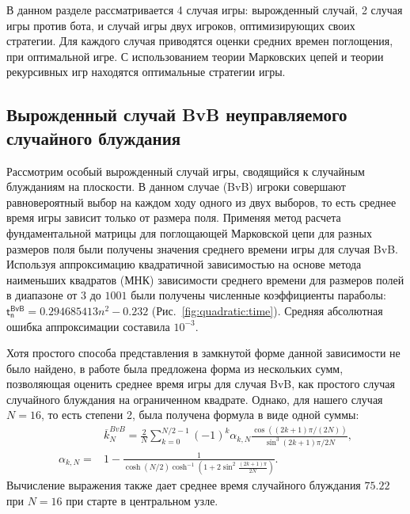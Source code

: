 В данном разделе рассматривается 4 случая игры: вырожденный случай, 2 случая игры против бота, и случай игры двух игроков, оптимизирующих своих стратегии. Для каждого случая приводятся оценки средних времен поглощения, при оптимальной игре. С использованием теории Марковских цепей и теории рекурсивных игр находятся оптимальные стратегии игры.

\subsection{Вырожденный случай BvB неуправляемого случайного блуждания}\label{subsec:ch3/sec3/sub1}

Рассмотрим особый вырожденный случай игры, сводящийся к случайным блужданиям на плоскости. В данном случае (BvB) игроки совершают равновероятный выбор на каждом ходу одного из двух выборов, то есть среднее время игры зависит только от размера поля. Применяя метод расчета фундаментальной матрицы для поглощающей Марковской цепи для разных размеров поля были получены значения среднего времени игры для случая BvB. Используя аппроксимацию квадратичной зависимостью на основе метода наименьших квадратов (МНК) зависимости среднего времени для размеров полей в диапазоне от $3$ до $1001$
были получены численные коэффициенты параболы: $\boldsymbol{\mathsf{t_n^{BvB}}} = 0.294685413 n^2 - 0.232$ (Рис.~\cref{fig:quadratic:time}). Средняя абсолютная ошибка аппроксимации составила $10^{-3}$. 

Хотя простого способа представления в замкнутой форме данной зависимости  не было найдено, в работе \cite{kmet_gamblers_2002} была предложена форма из нескольких сумм, позволяющая оценить
среднее время игры для случая BvB, как простого случая случайного блуждания на ограниченном квадрате. Однако, для нашего случая $N=16$, то есть степени 2, была получена формула в виде одной суммы:
\begin{equation}
	\begin{aligned}
		& \overline{k}_N^{BvB} = \frac{2}{N} \sum_{k=0}^{N/2-1} (-1)^k \alpha_{k,N} 
		\frac{\cos((2k+1)\pi/(2N))}{\sin^3{(2k+1)\pi/2N}}, \\
		\alpha_{k,N} =& 1-\frac{1}{\cosh(N/2)\cosh^{-1}\left(1+2\sin^2\frac{(2k+1)\pi}{2N}\right)}.
		\label{eq:absorption_bvb_center}
	\end{aligned}
\end{equation}
Вычисление выражения также дает среднее время случайного блуждания $75.22$ при $N=16$ при старте в центральном узле.

